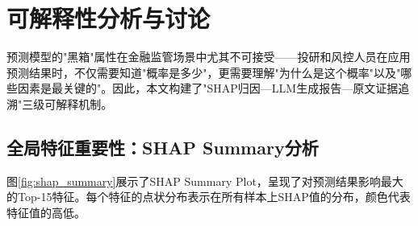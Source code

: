 
\section{可解释性分析与讨论}

预测模型的"黑箱"属性在金融监管场景中尤其不可接受——投研和风控人员在应用预测结果时，不仅需要知道"概率是多少"，更需要理解"为什么是这个概率"以及"哪些因素是最关键的"。因此，本文构建了"SHAP归因—LLM生成报告—原文证据追溯"三级可解释机制。

\subsection{全局特征重要性：SHAP Summary分析}

图\ref{fig:shap_summary}展示了SHAP Summary Plot，呈现了对预测结果影响最大的Top-15特征。每个特征的点状分布表示在所有样本上SHAP值的分布，颜色代表特征值的高低。

